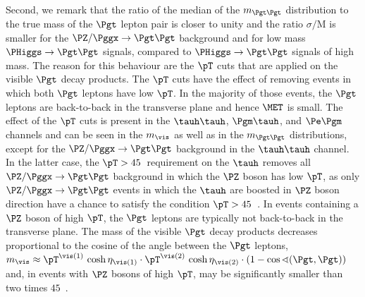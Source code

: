 Second, we remark that the ratio of the median of the $m_{\Pgt\Pgt}$ distribution to the true mass of the $\Pgt$ lepton pair 
is closer to unity and the ratio $\sigma/\textrm{M}$ is smaller
for the $\PZ/\Pggx \to \Pgt\Pgt$ background and for low mass $\PHiggs \to \Pgt\Pgt$ signals, compared to $\PHiggs \to \Pgt\Pgt$ signals of high mass.
The reason for this behaviour are the $\pT$ cuts that are applied on the visible $\Pgt$ decay products.
The $\pT$ cuts have the effect of removing events in which both $\Pgt$ leptons have low $\pT$.
In the majority of those events,
the $\Pgt$ leptons are back-to-back in the transverse plane and hence $\MET$ is small.
The effect of the $\pT$ cuts is present in the $\tauh\tauh$, $\Pgm\tauh$, and $\Pe\Pgm$ channels and can be seen in the $m_{\vis}$ as well as in the $m_{\Pgt\Pgt}$ distributions,
except for the $\PZ/\Pggx \to \Pgt\Pgt$ background in the $\tauh\tauh$ channel.
In the latter case,
the $\pT > 45$~\GeV requirement on the $\tauh$ removes all $\PZ/\Pggx \to \Pgt\Pgt$ background in which the $\PZ$ boson has low $\pT$,
as only $\PZ/\Pggx \to \Pgt\Pgt$ events in which the $\tauh$ are boosted in $\PZ$ boson direction have a chance to satisfy the condition $\pT > 45$~\GeV.
In events containing a $\PZ$ boson of high $\pT$,
the $\Pgt$ leptons are typically not back-to-back in the transverse plane.
The mass of the visible $\Pgt$ decay products decreases proportional to the cosine of the angle between the $\Pgt$ leptons,
$m_{\vis} \approx \pT^{\vis(1)} \, \cosh\eta_{\vis(1)} \cdot \pT^{\vis(2)} \, \cosh\eta_{\vis(2)} \cdot \left( 1 - \cos\sphericalangle(\Pgt,\Pgt) \right)$
and, in events with $\PZ$ bosons of high $\pT$, may be significantly smaller than two times $45$~\GeV.

